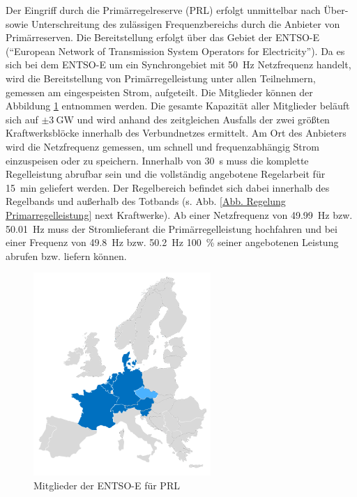 			Der Eingriff durch die Primärregelreserve (PRL) erfolgt unmittelbar nach Über- sowie Unterschreitung des zulässigen Frequenzbereichs durch die Anbieter von Primärreserven.
			Die Bereitstellung erfolgt über das Gebiet der ENTSO-E ("`European Network of Transmission System Operators for Electricity"').
			Da es sich bei dem ENTSO-E um ein Synchrongebiet mit \SI{50}{\hertz} Netzfrequenz handelt, wird die Bereitstellung von Primärregelleistung unter allen Teilnehmern, gemessen am eingespeisten Strom, aufgeteilt.
			Die Mitglieder können der Abbildung \ref{Abb. Mitglieder ENTSO-E} entnommen werden.
			Die gesamte Kapazität aller Mitglieder beläuft sich auf $\pm\SI{3}{\giga\watt}$ und wird anhand des zeitgleichen Ausfalls der zwei größten Kraftwerksblöcke innerhalb des Verbundnetzes ermittelt.
			Am Ort des Anbieters wird die Netzfrequenz gemessen, um schnell und frequenzabhängig Strom einzuspeisen oder zu speichern. 
			Innerhalb von \SI{30}{\second} muss die komplette Regelleistung abrufbar sein und die vollständig angebotene Regelarbeit für \SI{15}{\minute} geliefert werden.
			Der Regelbereich befindet sich dabei innerhalb des Regelbands und außerhalb des Totbands (s. Abb. \ref{Abb. Regelung Primarregelleistung} next Kraftwerke).
			Ab einer Netzfrequenz von \SI{49,99}{\hertz} bzw. \SI{50,01}{\hertz} muss der Stromlieferant die Primärregelleistung hochfahren und bei einer Frequenz von \SI{49,8}{\hertz} bzw. \SI{50,2}{\hertz} \SI{100}{\percent} seiner angebotenen Leistung abrufen bzw. liefern können. 
			
			\begin{figure}[H]
				\centering
				\includegraphics[page=1,trim=70 70 70 120, clip, width=0.6\textwidth]{./anhang/frc-map.png}
				\caption{Mitglieder der ENTSO-E für PRL\parencite{ENTSO-E_PRL}}
				\label{Abb. Mitglieder ENTSO-E}
			\end{figure}
			
